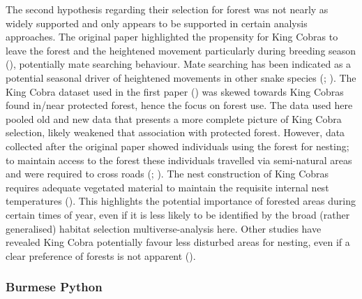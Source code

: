 \documentclass[10pt,a4paper]{article}
\begin{document}
The second hypothesis regarding their selection for forest was not nearly as widely supported and only appears to be supported in certain analysis approaches.
The original paper highlighted the propensity for King Cobras to leave the forest and the heightened movement particularly during breeding season (), potentially mate searching behaviour.
Mate searching has been indicated as a potential seasonal driver of heightened movements in other snake species (; ).
The King Cobra dataset used in the first paper () was skewed towards King Cobras found in/near protected forest, hence the focus on forest use.
The data used here pooled old and new data that presents a more complete picture of King Cobra selection, likely weakened that association with protected forest.
However, data collected after the original paper showed individuals using the forest for nesting; to maintain access to the forest these individuals travelled via semi-natural areas and were required to cross roads (; ).
The nest construction of King Cobras requires adequate vegetated material to maintain the requisite internal nest temperatures ().
This highlights the potential importance of forested areas during certain times of year, even if it is less likely to be identified by the broad (rather generalised) habitat selection multiverse-analysis here.
Other studies have revealed King Cobra potentially favour less disturbed areas for nesting, even if a clear preference of forests is not apparent ().

\subsubsection{Burmese Python}\label{burmese-python-1}
\end{document}
